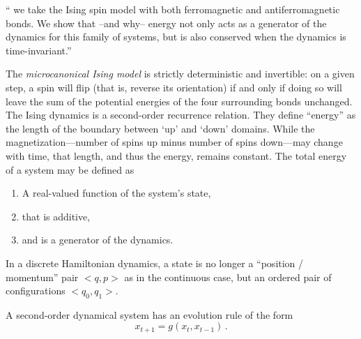\begin{description}
{``
we take the Ising spin model with both
ferromagnetic and antiferromagnetic bonds. We show that --and why--
energy not only acts as a generator of the dynamics for this family of
systems, but is also conserved when the dynamics is time-invariant.''

The \emph{microcanonical Ising model} is strictly deterministic and
invertible: on a given step, a spin will flip (that is, reverse its
orientation) if and only if doing so will leave the sum of the potential
energies of the four surrounding bonds unchanged. The Ising dynamics is a
second-order recurrence relation. They define ``energy'' as the length of the
boundary between `up' and `down' domains. While the magnetization—number of
spins up minus number of spins down—may change with time, that length, and
thus the energy, remains constant. The total energy of a system may be
defined as
\begin{enumerate}
  \item A real-valued function of the system's state,
  \item that is additive,
  \item and is a generator of the dynamics.
\end{enumerate}
In a discrete Hamiltonian dynamics, a state is no longer a
``position / momentum'' pair $<q,p>$ as in the continuous case, but an ordered
pair of configurations $<q_0,q_1>$.

A second-order dynamical system
has an evolution rule of the form
\[
x_{t+1} = g(x_{t},x_{t-1})
\,.
\]
            }

\end{description}


\printbibliography[heading=subbibintoc,title={References}]
